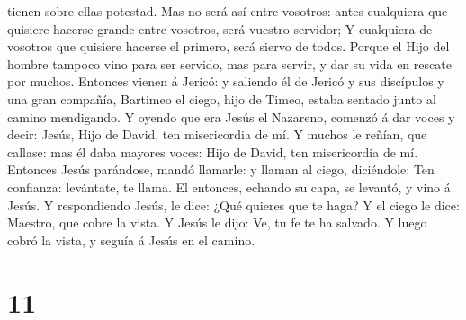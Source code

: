 tienen sobre ellas potestad.  Mas no será así entre
vosotros: antes cualquiera que quisiere hacerse grande entre vosotros,
será vuestro servidor;  Y cualquiera de vosotros que
quisiere hacerse el primero, será siervo de todos. 
Porque el Hijo del hombre tampoco vino para ser servido, mas para
servir, y dar su vida en rescate por muchos.  Entonces
vienen á Jericó: y saliendo él de Jericó y sus discípulos y una gran
compañía, Bartimeo el ciego, hijo de Timeo, estaba sentado junto al
camino mendigando.  Y oyendo que era Jesús el Nazareno,
comenzó á dar voces y decir: Jesús, Hijo de David, ten misericordia de
mí.  Y muchos le reñían, que callase: mas él daba mayores
voces: Hijo de David, ten misericordia de mí.  Entonces
Jesús parándose, mandó llamarle: y llaman al ciego, diciéndole: Ten
confianza: levántate, te llama.  El entonces, echando su
capa, se levantó, y vino á Jesús.  Y respondiendo Jesús,
le dice: ¿Qué quieres que te haga? Y el ciego le dice: Maestro, que
cobre la vista.  Y Jesús le dijo: Ve, tu fe te ha
salvado. Y luego cobró la vista, y seguía á Jesús en el camino.

\hypertarget{section-10}{%
\section{11}\label{section-10}}

